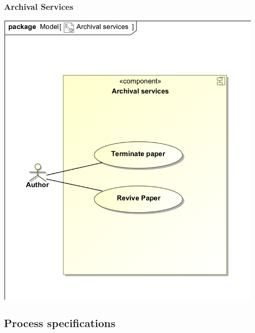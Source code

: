 \documentclass[11pt]{article}
\begin{document}
	\subsubsection{Archival Services}
	\begin{center}
		\includegraphics[width=\textwidth]{../Images/ArchivalServices_UseCase.png}\\[0.5cm]
	\end{center}
	\newpage
	
	\subsection{Process specifications}
	
\end{document}

